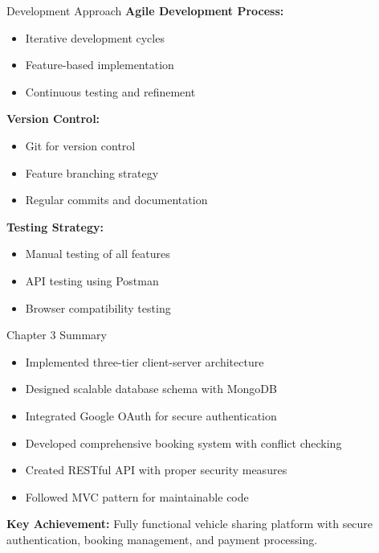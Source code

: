 \begin{frame}{Development Approach}
\textbf{Agile Development Process:}
\begin{itemize}
    \item Iterative development cycles
    \item Feature-based implementation
    \item Continuous testing and refinement
\end{itemize}

\vspace{0.3cm}
\textbf{Version Control:}
\begin{itemize}
    \item Git for version control
    \item Feature branching strategy
    \item Regular commits and documentation
\end{itemize}

\vspace{0.3cm}
\textbf{Testing Strategy:}
\begin{itemize}
    \item Manual testing of all features
    \item API testing using Postman
    \item Browser compatibility testing
\end{itemize}
\end{frame}

\begin{frame}{Chapter 3 Summary}
\begin{itemize}
    \item Implemented three-tier client-server architecture
    \item Designed scalable database schema with MongoDB
    \item Integrated Google OAuth for secure authentication
    \item Developed comprehensive booking system with conflict checking
    \item Created RESTful API with proper security measures
    \item Followed MVC pattern for maintainable code
\end{itemize}

\vspace{0.5cm}
\centering
\textbf{Key Achievement:} Fully functional vehicle sharing platform with secure authentication, booking management, and payment processing.
\end{frame}
